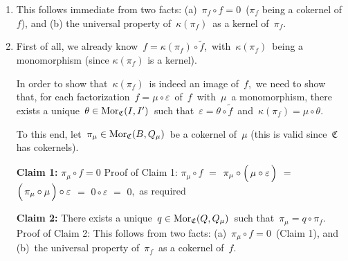 \begin{enumerate}
\item
	This follows immediate from two facts:
	(a)	\,$\pi_{f} \circ f = 0$\, ($\pi_{f}$ being a cokernel of $f$), and
	(b)	the universal property of \,$\kappa(\pi_{f})$\, as a kernel of \,$\pi_{f}$.\,
\item
	First of all, we already know \,$f = \kappa(\pi_{f}) \circ \widetilde{f}$,\,
	with \,$\kappa(\pi_{f})$\, being a monomorphism (since $\kappa(\pi_{f})$ is a kernel).
	\begin{center}
	\end{center}
	In order to show that \,$\kappa(\pi_{f})$\, is indeed an image of \,$f$,\,
	we need to show that, for each factorization \,$f = \mu \circ \varepsilon$\, of \,$f$\,
	with \,$\mu$\, a monomorphism, there exists a unique \,$\theta \in \textnormal{Mor}_{\mathfrak{C}}(I,I^{\prime})$\,
	such that \,$\varepsilon = \theta \circ \widetilde{f}$\, and \,$\kappa(\pi_{f}) = \mu \circ \theta$.
	
	\vskip 0.1cm
	\noindent
	To this end, let \,$\pi_{\mu} \in \textnormal{Mor}_{\mathfrak{C}}(B,Q_{\mu})$\, be a cokernel of \,$\mu$
	(this is valid since \,{\color{red}$\mathfrak{C}$\, has cokernels}).\,

	\vskip 0.3cm
	\noindent
	\textbf{Claim 1:}\;\; $\pi_{\mu} \circ f = 0$
	\vskip -0.1cm
	\noindent
	Proof of Claim 1:\;
	$\pi_{\mu} \circ f$
	\;$=$\; $\pi_{\mu} \circ \left(\,\mu \overset{{\color{white}1}}{\circ}\varepsilon\,\right)$
	\;$=$\; $\left(\,\pi_{\mu} \overset{{\color{white}1}}{\circ} \mu \,\right) \circ \varepsilon$
	\;$=$\; $0 \circ \varepsilon$
	\;$=$\; $0$,\,
	as required

	\vskip 0.3cm
	\noindent
	\textbf{Claim 2:}\;\; There exists a unique \,$q \in \textnormal{Mor}_{\mathfrak{C}}(Q,Q_{\mu})$\,
	such that \,$\pi_{\mu} = q \circ \pi_{f}$.\,
	\vskip 0.05cm
	\noindent
	Proof of Claim 2:\;
	This follows from two facts:\;
	(a)	\,$\pi_{\mu} \circ f = 0$\, (Claim 1), and
	(b)	\,the universal property of \,$\pi_{f}$\, as a cokernel of \,$f$.\,


\end{enumerate}
